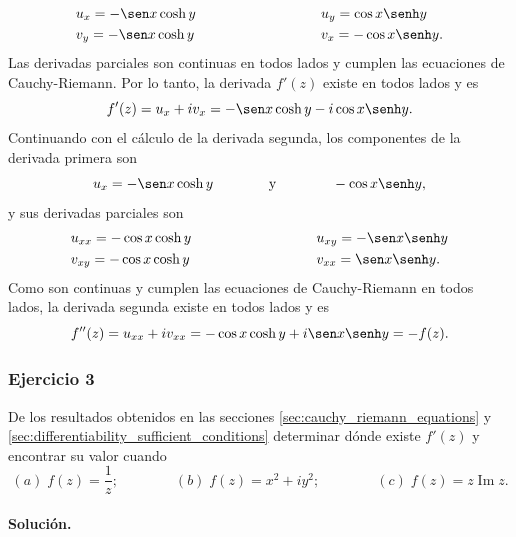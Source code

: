 \documentclass[a4paper]{report}
\renewcommand{\Im}{\operatorname{Im}}
\begin{document}
\begin{enumerate}
 \[
 \begin{array}{ll}
  u_x=-\sen x\cosh y\qquad\qquad\qquad\qquad&u_y=\cos x\senh y\\[\smallskipamount]
  v_y=-\sen x\cosh y\qquad\qquad\qquad\qquad&v_x=-\cos x\senh y.
 \end{array}
 \]
 Las derivadas parciales son continuas en todos lados y cumplen las ecuaciones de Cauchy-Riemann. Por lo tanto, la derivada \(f'(z)\) existe en todos lados y es
 \[
  f'(z)=u_x+iv_x=-\sen x\cosh y-i\cos x\senh y.
 \]
 Continuando con el cálculo de la derivada segunda, los componentes de la derivada primera son
 \[
  u_x=-\sen x\cosh y
  \qquad\qquad\textrm{y}\qquad\qquad
  -\cos x\senh y,
 \]
 y sus derivadas parciales son 
 \[
 \begin{array}{ll}
  u_{xx}=-\cos x\cosh y\qquad\qquad\qquad\qquad&u_{xy}=-\sen x\senh y\\[\smallskipamount]
  v_{xy}=-\cos x\cosh y\qquad\qquad\qquad\qquad&v_{xx}=\sen x\senh y.
 \end{array}
 \]
 Como son continuas y cumplen las ecuaciones de Cauchy-Riemann en todos lados, la derivada segunda existe en todos lados y es
 \[
  f''(z)=u_{xx}+iv_{xx}=-\cos x\cosh y+i\sen x\senh y=-f(z).
 \]
\end{enumerate}

\subsubsection{Ejercicio 3}

De los resultados obtenidos en las secciones \ref{sec:cauchy_riemann_equations} y \ref{sec:differentiability_sufficient_conditions} determinar dónde existe \(f'(z)\) y encontrar su valor cuando
\[
  (\textit{a})\;f(z)=\frac{1}{z};\qquad\qquad
  (\textit{b})\;f(z)=x^2+iy^2;\qquad\qquad
  (\textit{c})\;f(z)=z\Im z.
\]

\paragraph{Solución.} 
\end{document}
